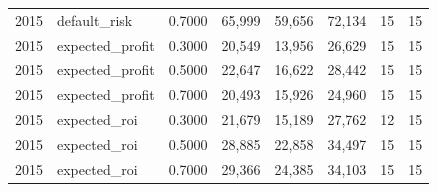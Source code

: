 \begin{table}[t]
\begin{tabular}{rlrrrrrr}
2015 & default\_risk & 0.7000 & 65,999 & 59,656 & 72,134 & 15 & 15 \\
2015 & expected\_profit & 0.3000 & 20,549 & 13,956 & 26,629 & 15 & 15 \\
2015 & expected\_profit & 0.5000 & 22,647 & 16,622 & 28,442 & 15 & 15 \\
2015 & expected\_profit & 0.7000 & 20,493 & 15,926 & 24,960 & 15 & 15 \\
2015 & expected\_roi & 0.3000 & 21,679 & 15,189 & 27,762 & 12 & 15 \\
2015 & expected\_roi & 0.5000 & 28,885 & 22,858 & 34,497 & 15 & 15 \\
2015 & expected\_roi & 0.7000 & 29,366 & 24,385 & 34,103 & 15 & 15 \\
\bottomrule
\end{tabular}
\end{table}
